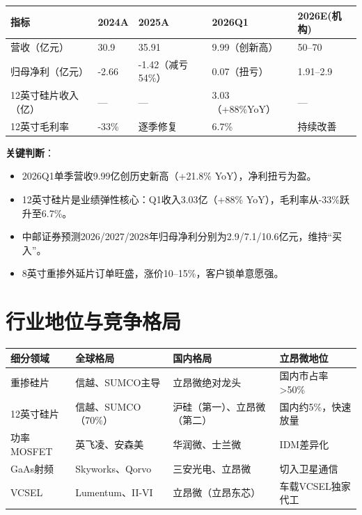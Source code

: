\documentclass[a4paper,11pt,fontset=none]{ctexart}
\begin{document}
\begin{exhibitbox}
\begin{tabularx}{\textwidth}{L{3cm}XXXX}
\toprule
\textbf{指标} & \textbf{2024A} & \textbf{2025A} & \textbf{2026Q1} & \textbf{2026E(机构)} \\
\midrule
营收（亿元） & 30.9 & 35.91 & 9.99（创新高） & 50--70 \\
归母净利（亿元） & -2.66 & -1.42（减亏54\%） & 0.07（扭亏） & 1.91--2.9 \\
12英寸硅片收入（亿） & --- & --- & 3.03（+88\%YoY） & --- \\
12英寸毛利率 & -33\% & 逐季修复 & 6.7\% & 持续改善 \\
\bottomrule
\end{tabularx}
\end{exhibitbox}

\textbf{关键判断}：
\begin{itemize}
  \item 2026Q1单季营收9.99亿创历史新高（+21.8\% YoY），净利扭亏为盈。
  \item 12英寸硅片是业绩弹性核心：Q1收入3.03亿（+88\% YoY），毛利率从-33\%跃升至6.7\%。
  \item 中邮证券预测2026/2027/2028年归母净利分别为2.9/7.1/10.6亿元，维持``买入''。
  \item 8英寸重掺外延片订单旺盛，涨价10--15\%，客户锁单意愿强。
\end{itemize}

\section{行业地位与竞争格局}

\begin{tabularx}{\textwidth}{L{3cm}L{3.5cm}L{3.5cm}X}
\toprule
\textbf{细分领域} & \textbf{全球格局} & \textbf{国内格局} & \textbf{立昂微地位} \\
\midrule
重掺硅片 & 信越、SUMCO主导 & 立昂微绝对龙头 & 国内市占率>50\% \\
12英寸硅片 & 信越、SUMCO（70\%） & 沪硅（第一）、立昂微（第二） & 国内约5\%，快速放量 \\
功率MOSFET & 英飞凌、安森美 & 华润微、士兰微 & IDM差异化 \\
GaAs射频 & Skyworks、Qorvo & 三安光电、立昂微 & 切入卫星通信 \\
VCSEL & Lumentum、II-VI & 立昂微（立昂东芯） & 车载VCSEL独家代工 \\
\bottomrule
\end{tabularx}
\end{document}
